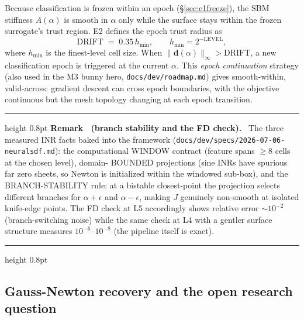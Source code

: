 \documentclass[11pt]{article}
\newcounter{remark}
\newenvironment{remark}[1]{%
  \refstepcounter{remark}\par\medskip
  \noindent\begin{minipage}{\linewidth}
  \hrule height 0.8pt \smallskip
  \textbf{Remark \theremark\ (#1).}\ }{%
  \smallskip\hrule height 0.8pt \end{minipage}\par\medskip}
\begin{document}
Because classification is frozen within an epoch (\S\ref{sec:e1freeze}),
the SBM stiffness $A(\alpha)$ is smooth in $\alpha$ only while the surface
stays within the frozen surrogate's trust region.  E2 defines the epoch
trust radius as
\begin{equation}
  \text{DRIFT} \;=\; 0.35\, h_{\min}, \qquad h_{\min} = 2^{-\text{LEVEL}},
  \label{eq:e2drift}
\end{equation}
where $h_{\min}$ is the finest-level cell size.  When
$\|\mathbf{d}(\alpha)\|_\infty > \text{DRIFT}$, a new classification epoch
is triggered at the current $\alpha$.  This \emph{epoch continuation}
strategy (also used in the M3 bunny hero, \texttt{docs/dev/roadmap.md})
gives smooth-within, valid-across: gradient descent can cross epoch
boundaries, with the objective continuous but the mesh topology changing
at each epoch transition.

\begin{remark}{branch stability and the FD check}
The three measured INR facts baked into the framework
(\texttt{docs/dev/specs/2026-07-06-neuralsdf.md}): the computational
WINDOW contract (feature spans $\geq 8$ cells at the chosen level), domain-
BOUNDED projections (sine INRs have spurious far zero sheets, so Newton is
initialized within the windowed sub-box), and the BRANCH-STABILITY rule:
at a bistable closest-point the projection selects different branches for
$\alpha + \epsilon$ and $\alpha - \epsilon$, making $J$ genuinely
non-smooth at isolated knife-edge points.  The FD check at L5 accordingly
shows relative error $\sim 10^{-2}$ (branch-switching noise) while the
same check at L4 with a gentler surface structure measures $10^{-6}$--$10^{-8}$
(the pipeline itself is exact).
\end{remark}

\subsection{Gauss-Newton recovery and the open research question}
\label{sec:e2recovery}
\end{document}
